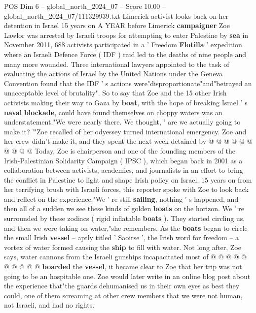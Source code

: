 \begin{textsample}{POS Dim 6 – global\_north\_2024\_07 – Score 10.00 – global\_north\_2024\_07/111329939.txt}  \label{ex:f6_pos_301}
Limerick activist looks back on her detention in Israel 15 years on A YEAR before Limerick \textbf{campaigner} Zoe Lawlor was arrested by Israeli troops for attempting to enter Palestine by \textbf{sea} in November 2011, 688 activists participated in a ' Freedom \textbf{Flotilla} ' expedition where an Israeli Defence Force ( IDF ) raid led to the deaths of nine people and many more wounded.
Three international lawyers appointed to the task of evaluating the actions of Israel by the United Nations under the Geneva Convention found that the IDF ' s actions were"disproportionate"and"betrayed an unacceptable level of brutality".
So to say that Zoe and the 15 other Irish activists making their way to Gaza by \textbf{boat}, with the hope of breaking Israel ' s \textbf{naval} \textbf{blockade}, could have found themselves on choppy waters was an understatement."We were nearly there.
We thought, ' are we actually going to make it? '"Zoe recalled of her odyessey turned international emergency.
Zoe and her crew didn't make it, and they spent the next week detained by @ @ @ @ @ @ @ @ @ @ Today, Zoe is chairperson and one of the founding members of the Irish-Palestinian Solidarity Campaign ( IPSC ), which began back in 2001 as a collaboration between activists, academics, and journalists in an effort to bring the conflict in Palestine to light and shape Irish policy on Israel. 15 years on from her terrifying brush with Israeli forces, this reporter spoke with Zoe to look back and reflect on the experience."We ' re still \textbf{sailing}, nothing ' s happened, and then all of a sudden we see these kinds of golden \textbf{boats} on the horizon.
We ' re surrounded by these zodiacs ( rigid inflatable \textbf{boats} ).
They started circling us, and then we were taking on water,"she remembers.
As the \textbf{boats} began to circle the small Irish \textbf{vessel} -- aptly titled ' Saoirse ', the Irish word for freedom -- a vortex of water formed causing the \textbf{ship} to fill with water.
Not long after, Zoe says, water cannons from the Israeli gunships incapacitated most of @ @ @ @ @ @ @ @ @ @ \textbf{boarded} the \textbf{vessel}, it became clear to Zoe that her trip was not going to be an hospitable one.
Zoe would later write in an online blog post about the experience that"the guards dehumanised us in their own eyes as best they could, one of them screaming at other crew members that we were not human, not Israeli, and had no rights.

\end{textsample}
